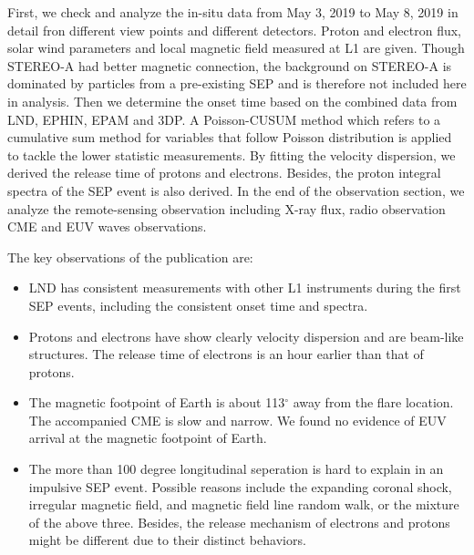 First, we check and analyze the in-situ data from May 3, 2019 to May 8, 2019 in detail fron different view points and different detectors. Proton and electron flux, solar wind parameters and local magnetic field measured at \ac{L1} are given.
Though \ac{STEREO}-A had better magnetic connection, the background on \ac{STEREO}-A is dominated by particles from a pre-existing \ac{SEP} and is therefore not included here in analysis.
Then we determine the onset time based on the combined data from \ac{LND}, \ac{EPHIN}, \ac{EPAM} and \acs{3DP}. A Poisson-CUSUM method \citep{Huttunen2005AA, Palmroos2022FrASS} which refers to a cumulative sum method for variables that follow Poisson distribution is applied to tackle the lower statistic measurements. By fitting the velocity dispersion, we derived the release time of protons and electrons. Besides, the proton integral spectra of the \ac{SEP} event is also derived. In the end of the observation section, we analyze the remote-sensing observation including X-ray flux, radio observation \ac{CME} and EUV waves observations.

The key observations of the publication are:
\begin{itemize}
    \item \ac{LND} has consistent measurements with other \ac{L1} instruments during the first \ac{SEP} events, including the consistent onset time and spectra.
    \item Protons and electrons have show clearly velocity dispersion and are beam-like structures. The release time of electrons is an hour earlier than that of protons.
    \item The magnetic footpoint of Earth is about 113$^\circ$ away from the flare location. The accompanied \ac{CME} is slow and narrow. We found no evidence of EUV arrival at the magnetic footpoint of Earth. 
    \item The more than 100 degree longitudinal seperation is hard to explain in an impulsive \ac{SEP} event. Possible reasons include the expanding coronal shock, irregular magnetic field, and magnetic field line random walk, or the mixture of the above three. Besides, the release mechanism of electrons and protons might be different due to their distinct behaviors.
\end{itemize}


